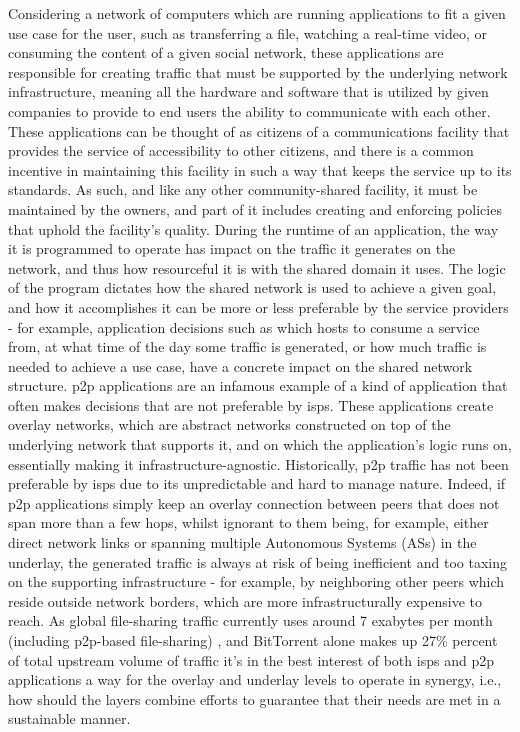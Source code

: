     Considering a network of computers which are running applications to fit a given use case for the user, such as transferring a file, watching a real-time video, or consuming the content of a given social network, these applications are responsible for creating traffic that must be supported by the underlying network infrastructure, meaning all the hardware and software that is utilized by given companies to provide to end users the ability to communicate with each other.
    These applications can be thought of as citizens of a communications facility that provides the service of accessibility to other citizens, and there is a common incentive in maintaining this facility in such a way that keeps the service up to its standards.
    As such, and like any other community-shared facility, it must be maintained by the owners, and part of it includes creating and enforcing policies that uphold the facility's quality.
    During the runtime of an application, the way it is programmed to operate has impact on the traffic it generates on the network, and thus how resourceful it is with the shared domain it uses.
    The logic of the program dictates how the shared network is used to achieve a given goal, and how it accomplishes it can be more or less preferable by the service providers - for example, application decisions such as which hosts to consume a service from, at what time of the day some traffic is generated, or how much traffic is needed to achieve a use case, have a concrete impact on the shared network structure.
    \gls{p2p} applications are an infamous example of a kind of application that often makes decisions that are not preferable by \glspl{isp}.
    These applications create overlay networks, which are abstract networks constructed on top of the underlying network that supports it, and on which the application's logic runs on, essentially making it infrastructure-agnostic.
    Historically, \gls{p2p} traffic has not been preferable by \glspl{isp} due to its unpredictable and hard to manage nature.
    Indeed, if \gls{p2p} applications simply keep an overlay connection between peers that does not span more than a few hops, whilst ignorant to them being, for example, either direct network links or spanning multiple Autonomous Systems (ASs) in the underlay, the generated traffic is always at risk of being inefficient and too taxing on the supporting infrastructure - for example, by neighboring other peers which reside outside network borders, which are more infrastructurally expensive to reach.
    As global file-sharing traffic currently uses around 7 exabytes per month (including \gls{p2p}-based file-sharing) \cite{cisco2019}, and BitTorrent alone makes up 27\% percent of total upstream volume of traffic \cite{sandvine2019} it's in the best interest of both \glspl{isp} and \gls{p2p} applications a way for the overlay and underlay levels to operate in synergy, i.e., how should the layers combine efforts to guarantee that their needs are met in a sustainable manner.

